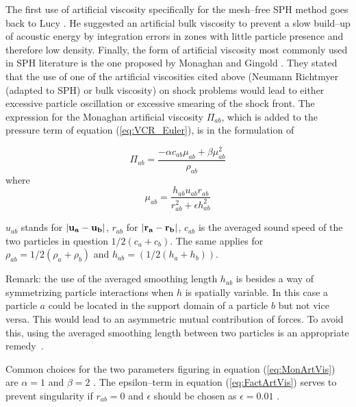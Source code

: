 \documentclass[11pt,a4paper,twoside]{report}
\begin{document}
The first use of artificial viscosity specifically for the mesh--free SPH method goes back to Lucy \cite{Lucy1977}. He suggested an artificial bulk viscosity to
prevent a slow build--up of acoustic energy by integration errors in zones with
little particle presence and therefore low density. 
Finally, the form of artificial viscosity most commonly used in SPH
literature \cite{Liu2003} is the one proposed by Monaghan and
Gingold \cite{Monaghan1983}. They stated that the use of one of the artificial
viscosities cited above (Neumann Richtmyer (adapted to SPH) or bulk
viscosity) on shock problems would lead to either excessive particle
oscillation or excessive smearing of the shock front. The expression for the Monaghan artificial viscosity $\Pi_{ab}$, which is added to the pressure term of
equation (\ref{eq:VCR_Euler}), is in the formulation of \cite{Monaghan1992}

\begin{equation}
\label{eq:MonArtVis}
\Pi_{\mathit{ab}}= \frac{-\alpha c_{\mathit{ab}}\mu_{ab}+\beta \mu_{ab}^2}{\rho_{ab}}
\end{equation}
where 
\begin{equation}
\label{eq:FactArtVis}
\mu_{ab}=\frac{h_{ab}u_{ab}r_{ab}}{r_{ab}^2+\epsilon h_{ab}^2}
\end{equation}

$u_{ab}$ stands for $|{\bf u_a}-{\bf u_b}|$, $r_{ab}$ for $|{\bf r_a}-{\bf r_b}|$, $c_{ab}$ is the
averaged sound speed of the two particles in question $1/2(c_a+c_b)$. The same
applies for $\rho_{ab}=1/2(\rho_a+\rho_b)$ and $h_{ab}=(1/2(h_a+h_b))$. 

Remark: the use of the averaged smoothing length $h_{ab}$ is besides a way of symmetrizing particle interactions when $h$ is spatially variable. In this case a particle $a$ could be located in the support domain of a particle $b$ but not vice versa. This would lead to an asymmetric mutual contribution of forces. To avoid this, using the averaged smoothing length between two particles is an appropriate remedy~\cite{Liu2003}.

Common choices for the two parameters figuring in equation (\ref{eq:MonArtVis}) are $\alpha=1$ and $\beta=2$ \cite{Monaghan1992}. The epsilon--term in equation (\ref{eq:FactArtVis}) serves to prevent singularity if $r_{ab}=0$ and $\epsilon$ should be chosen as $\epsilon=0.01$ \cite{Monaghan1992}.
\end{document}

